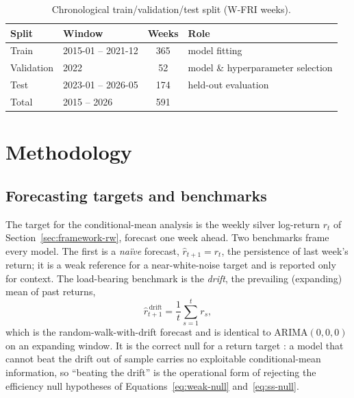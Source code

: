 \documentclass[12pt, a4paper]{article}
\begin{document}
\begin{table}[htbp]
    \centering
    \caption{Chronological train/validation/test split (W-FRI weeks).}
    \label{tab:split}
    \begin{tabular}{llcl}
        \toprule
        Split      & Window               & Weeks & Role \\
        \midrule
        Train      & 2015-01 -- 2021-12   & 365   & model fitting \\
        Validation & 2022                 & 52    & model \& hyperparameter selection \\
        Test       & 2023-01 -- 2026-05   & 174   & held-out evaluation \\
        \midrule
        Total      & 2015 -- 2026         & 591   & \\
        \bottomrule
    \end{tabular}
\end{table}

\section{Methodology}
\label{sec:method}

\subsection{Forecasting targets and benchmarks}
\label{sec:method-target}

The target for the conditional-mean analysis is the weekly silver log-return \(r_t\) of
Section~\ref{sec:framework-rw}, forecast one week ahead. Two benchmarks frame every model.
The first is a \emph{na\"ive} forecast, \(\hat r_{t+1} = r_t\), the persistence of last
week's return; it is a weak reference for a near-white-noise target and is reported only
for context. The load-bearing benchmark is the \emph{drift}, the prevailing (expanding)
mean of past returns,
\begin{equation}
    \hat r_{t+1}^{\,\text{drift}} = \frac{1}{t}\sum_{s=1}^{t} r_s,
    \label{eq:drift}
\end{equation}
which is the random-walk-with-drift forecast and is identical to \(\mathrm{ARIMA}(0,0,0)\)
on an expanding window. It is the correct null for a return target
\parencite{welch2008,campbell2008}: a model that cannot beat the drift out of sample
carries no exploitable conditional-mean information, so ``beating the drift'' is the
operational form of rejecting the efficiency null hypotheses of Equations~\eqref{eq:weak-null}
and~\eqref{eq:ss-null}.
\end{document}
